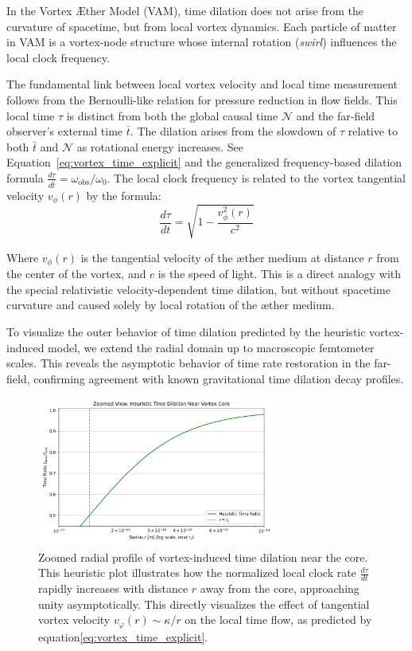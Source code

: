 In the Vortex Æther Model (VAM), time dilation does not arise from the curvature of spacetime, but from local vortex dynamics. Each particle of matter in VAM is a vortex-node structure whose internal rotation (\textit{swirl}) influences the local clock frequency.

The fundamental link between local vortex velocity and local time measurement follows from the Bernoulli-like relation for pressure reduction in flow fields. This local time $\tau$ is distinct from both the global causal time $\mathcal{N}$ and the far-field observer’s external time $\bar{t}$. The dilation arises from the slowdown of $\tau$ relative to both $\bar{t}$ and $\mathcal{N}$ as rotational energy increases. See Equation~\eqref{eq:vortex_time_explicit} and the generalized frequency-based dilation formula $\frac{d\tau}{d\bar{t}} = \omega_{\text{obs}}/\omega_0$.  The local clock frequency is related to the vortex tangential velocity $v_{\phi}(r)$ by the formula:
\begin{equation}\label{eq:vortex_time_dilation}
\frac{d\tau}{dt} = \sqrt{1 - \frac{v_{\phi}^2(r)}{c^2}}
\end{equation}

Where $v_{\phi}(r)$ is the tangential velocity of the æther medium at distance $r$ from the center of the vortex, and $c$ is the speed of light. This is a direct analogy with the special relativistic velocity-dependent time dilation, but without spacetime curvature and caused solely by local rotation of the æther medium.

To visualize the outer behavior of time dilation predicted by the heuristic vortex-induced model, we extend the radial domain up to macroscopic femtometer scales. This reveals the asymptotic behavior of time rate restoration in the far-field, confirming agreement with known gravitational time dilation decay profiles.

\begin{figure}[H]
    \centering
    \includegraphics[width=0.7\textwidth]{images/06-HeuristicTimeDilation4}
    \caption{
        Zoomed radial profile of vortex-induced time dilation near the core.
        This heuristic plot illustrates how the normalized local clock rate
        $\frac{d\tau}{dt}$ rapidly increases with distance $r$ away from the core,
        approaching unity asymptotically. This directly visualizes the effect of
        tangential vortex velocity $v_\varphi(r) \sim \kappa / r$ on the local time flow,
        as predicted by equation\eqref{eq:vortex_time_explicit}.
    }
    \label{fig:HeuristicTimeDilation}
\end{figure}


